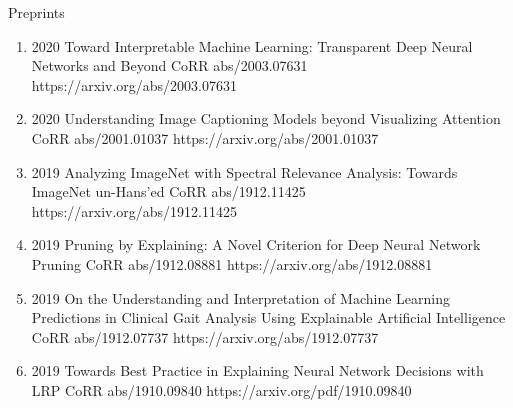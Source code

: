 \documentclass[10pt,a4paper]{article} %
\begin{document}
\headedsection %
{Preprints}{}
{
    \begin{enumerate}

        \item[] 
                            {2020}
                            {Toward Interpretable Machine Learning: Transparent Deep Neural Networks and Beyond}
                            {CoRR abs/2003.07631}
                            {https://arxiv.org/abs/2003.07631}

        \item[] 
                            {2020}
                            {Understanding Image Captioning Models beyond Visualizing Attention}
                            {CoRR abs/2001.01037}
                            {https://arxiv.org/abs/2001.01037}

        \item[] 
                            {2019}
                            {Analyzing ImageNet with Spectral Relevance Analysis: Towards ImageNet un-Hans'ed}
                            {CoRR abs/1912.11425}
                            {https://arxiv.org/abs/1912.11425}

        \item[] 
                            {2019}
                            {Pruning by Explaining: A Novel Criterion for Deep Neural Network Pruning}
                            {CoRR abs/1912.08881}
                            {https://arxiv.org/abs/1912.08881}

        \item[] 
                            {2019}
                            {On the Understanding and Interpretation of Machine Learning Predictions in Clinical Gait Analysis Using Explainable Artificial Intelligence}
                            {CoRR abs/1912.07737}
                            {https://arxiv.org/abs/1912.07737}

        \item[] 
                            {2019}
                            {Towards Best Practice in Explaining Neural Network Decisions with LRP}
                            {CoRR abs/1910.09840}
                            {https://arxiv.org/pdf/1910.09840}


\end{enumerate}}
\end{document}
